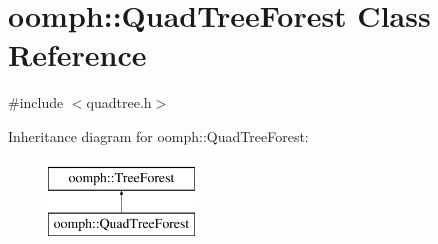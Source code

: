 \hypertarget{classoomph_1_1QuadTreeForest}{}\section{oomph\+:\+:Quad\+Tree\+Forest Class Reference}
\label{classoomph_1_1QuadTreeForest}


{\ttfamily \#include $<$quadtree.\+h$>$}

Inheritance diagram for oomph\+:\+:Quad\+Tree\+Forest\+:\begin{figure}[H]
\begin{center}
\leavevmode
\includegraphics[height=2.000000cm]{classoomph_1_1QuadTreeForest}
\end{center}
\end{figure}
